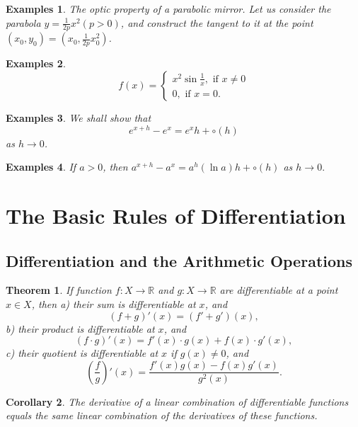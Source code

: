 \documentclass[a4paper,12pt]{article} %
\newtheorem{theorem}{Theorem}[section]
\newtheorem{corollary}[theorem]{Corollary}
\newtheorem{example}{Examples}
\begin{document}
\begin{example}
    The optic property of a parabolic mirror. Let us consider the 
    parabola $y = \frac{1}{2p}x^2(p>0)$, and construct the tangent to 
    it at the point $(x_0, y_0) = (x_0, \frac{1}{2p}x_0^2)$.  
\end{example}

\begin{example}
    \[
        f(x) = \left\{\begin{array}{c} x^2\sin \frac{1}{x}, \text{ if } x \ne 0 \\
        0, \text{ if } x = 0. \end{array} \right.
        \]
\end{example}

\begin{example}
    We shall show that 
    \[
        e^{x+h} - e^x = e^xh + \circ(h)
        \] as $h \to 0$.
\end{example}

\begin{example}
    If $a > 0$, then $a^{x+h} - a^x = a^h(\ln a)h + \circ(h)$
    as $h \to 0.$
\end{example}

\section{The Basic Rules of Differentiation}
\subsection{Differentiation and the Arithmetic Operations}
\begin{theorem}
    If function $f: X \to \mathbb{R}$ and $g: X \to \mathbb{R}$ are 
    differentiable at a point $x \in X$, then 
    a) their sum is differentiable at $x$, and 
    \[
        \left(f+g\right)'(x) = \left(f' + g'\right)(x),
        \]
    b) their product is differentiable at $x$, and 
    \[
        \left(f\cdot g\right)'(x) = f'(x)\cdot g(x) + f(x)\cdot g'(x),
        \]
    c) their quotient is differentiable at $x$ if $g(x) \ne 0$, and 
    \[
        \left(\frac{f}{g}\right)'(x) = \frac{f'(x)g(x) - f(x)g'(x)}{g^2(x)}.
        \]
\end{theorem}

\begin{corollary}
    The derivative of a linear combination of differentiable functions 
    equals the same linear combination of the derivatives of these 
    functions.
\end{corollary}
\end{document}
